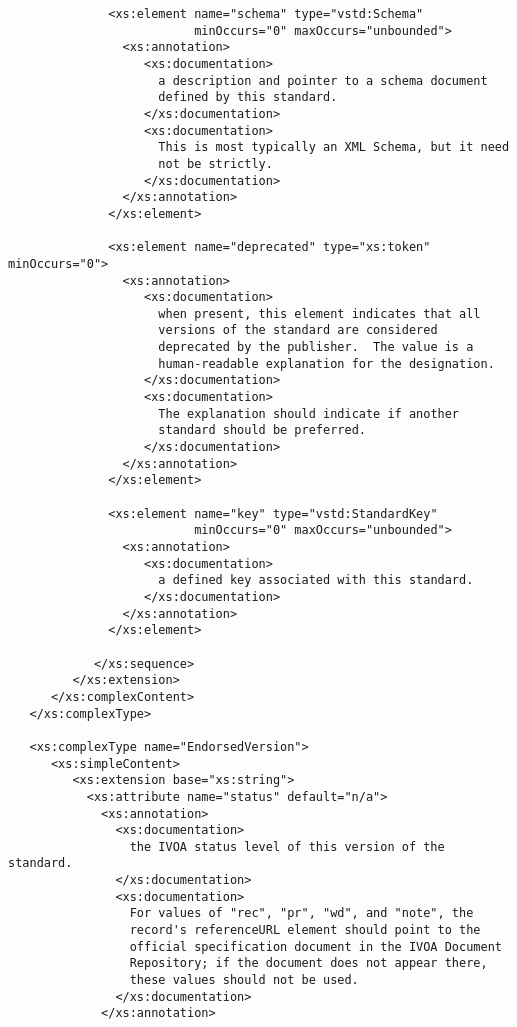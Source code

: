 \documentclass[11pt,a4paper]{ivoa}
\begin{document}
{{\begin{verbatim}
              <xs:element name="schema" type="vstd:Schema" 
                          minOccurs="0" maxOccurs="unbounded">
                <xs:annotation>
                   <xs:documentation>
                     a description and pointer to a schema document
                     defined by this standard.
                   </xs:documentation>
                   <xs:documentation>
                     This is most typically an XML Schema, but it need
                     not be strictly.  
                   </xs:documentation>
                </xs:annotation>
              </xs:element>

              <xs:element name="deprecated" type="xs:token" minOccurs="0">
                <xs:annotation>
                   <xs:documentation>
                     when present, this element indicates that all
                     versions of the standard are considered
                     deprecated by the publisher.  The value is a 
                     human-readable explanation for the designation.
                   </xs:documentation>
                   <xs:documentation>
                     The explanation should indicate if another
                     standard should be preferred.  
                   </xs:documentation>
                </xs:annotation>
              </xs:element>

              <xs:element name="key" type="vstd:StandardKey" 
                          minOccurs="0" maxOccurs="unbounded">
                <xs:annotation>
                   <xs:documentation>
                     a defined key associated with this standard.
                   </xs:documentation>
                </xs:annotation>
              </xs:element>

            </xs:sequence>
         </xs:extension>
      </xs:complexContent>
   </xs:complexType>

   <xs:complexType name="EndorsedVersion">
      <xs:simpleContent>
         <xs:extension base="xs:string">
           <xs:attribute name="status" default="n/a">
             <xs:annotation>
               <xs:documentation>
                 the IVOA status level of this version of the standard.
               </xs:documentation>
               <xs:documentation>
                 For values of "rec", "pr", "wd", and "note", the
                 record's referenceURL element should point to the
                 official specification document in the IVOA Document
                 Repository; if the document does not appear there,
                 these values should not be used. 
               </xs:documentation>
             </xs:annotation>


\end{verbatim}}}
\end{document}
